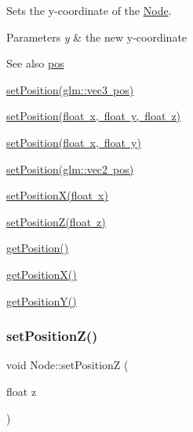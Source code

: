 Sets the y-\/coordinate of the \mbox{\hyperlink{classsage_1_1Node}{Node}}. 


\begin{DoxyParams}{Parameters}
{\em y} & the new y-\/coordinate \\
\hline
\end{DoxyParams}
\begin{DoxySeeAlso}{See also}
\mbox{\hyperlink{classsage_1_1Node_a26c32e5ec11e0ed7f33053ecac6830d5}{pos}} 

\mbox{\hyperlink{classsage_1_1Node_a12f5d88d221aa5db70c2bd53f6dc049a}{set\+Position(glm\+::vec3 pos)}} 

\mbox{\hyperlink{classsage_1_1Node_ad9899110e543c6b16997512e47c142c9}{set\+Position(float x, float y, float z)}} 

\mbox{\hyperlink{classsage_1_1Node_aaa8545c103ef1b35e5076dbedab93af5}{set\+Position(float x, float y)}} 

\mbox{\hyperlink{classsage_1_1Node_ae2731cefe38e706c2bf21afae6da18b3}{set\+Position(glm\+::vec2 pos)}} 

\mbox{\hyperlink{classsage_1_1Node_ae1dfc73d6122a95778d5d9db3d1fd913}{set\+Position\+X(float x)}} 

\mbox{\hyperlink{classsage_1_1Node_a0dd2e816d50418b9b63a78fdf166ba53}{set\+Position\+Z(float z)}} 

\mbox{\hyperlink{classsage_1_1Node_a11fbdf2a2dcdf8bdc014df65f3003925}{get\+Position()}} 

\mbox{\hyperlink{classsage_1_1Node_a17e92da5beaeb4b299c4e93729a22b1a}{get\+Position\+X()}} 

\mbox{\hyperlink{classsage_1_1Node_a26337a40b7da400233451b71e85759cc}{get\+Position\+Y()}} 
\end{DoxySeeAlso}
\mbox{\label{classsage_1_1Node_a0dd2e816d50418b9b63a78fdf166ba53}} 
\subsubsection{\texorpdfstring{setPositionZ()}{setPositionZ()}}
{\footnotesize\ttfamily void Node\+::set\+PositionZ (\begin{DoxyParamCaption}\item[{float}]{z }\end{DoxyParamCaption})}



